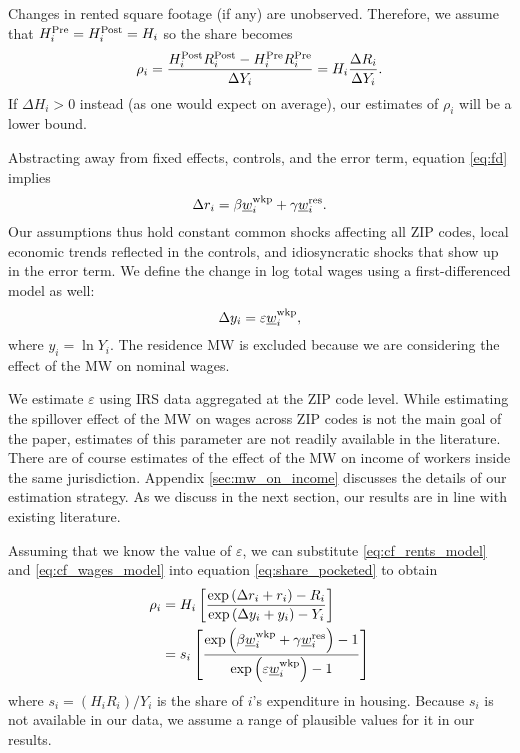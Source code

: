 Changes in rented square footage (if any) are unobserved.
Therefore, we assume that
$H^{\text{Pre}}_i = H^{\text{Post}}_i = H_i$ 
so the share becomes
\begin{equation}\label{eq:share_pocketed}
    \rho_i = \frac{H^{\text{Post}}_i R^{\text{Post}}_i - H^{\text{Pre}}_i R^{\text{Pre}}_i}{\Delta Y_i} = 
                H_i \frac{\Delta R_i}{\Delta Y_i} .
\end{equation}
If $\Delta H_i > 0$ instead (as one would expect on average), 
our estimates of $\rho_i$ will be a lower bound.

Abstracting away from fixed effects, controls, and the error term, 
equation \eqref{eq:fd} implies
\begin{equation}\label{eq:cf_rents_model}
    \Delta r_i = \beta \underline{w}_i^{\text{wkp}} + \gamma \underline{w}_i^{\text{res}} .
\end{equation}
Our assumptions thus hold 
constant common shocks affecting all ZIP codes,
local economic trends reflected in the controls, and
idiosyncratic shocks that show up in the error term.
We define the change in log total wages using a first-differenced model as well:
\begin{equation}\label{eq:cf_wages_model}
    \Delta y_i = \varepsilon \underline{w}_i^{\text{wkp}} ,
\end{equation}
where $y_i=\ln Y_i$.
The residence MW is excluded because we are considering the effect of the MW on 
nominal wages.

We estimate $\varepsilon$ using IRS data aggregated at the ZIP code level.
While estimating the spillover effect of the MW on wages across ZIP codes is 
not the main goal of the paper, 
estimates of this parameter are not readily available in the literature.
There are of course estimates of the effect of the MW on income of workers
inside the same jurisdiction.
Appendix \ref{sec:mw_on_income} discusses the details of our estimation 
strategy.
As we discuss in the next section, our results are in line with existing 
literature.

%
%
%

Assuming that we know the value of $\varepsilon$, we can substitute
\eqref{eq:cf_rents_model} and \eqref{eq:cf_wages_model} into equation
\eqref{eq:share_pocketed} to obtain
\begin{equation}\label{eq:rho}
    \begin{split}
        \rho_i & = H_i \left[ 
        \frac{\exp \left(\Delta r_i + r_i \right) - R_i }
             {\exp \left(\Delta y_i + y_i \right) - Y_i }
        \right] \\
        & = s_i \left[
            \frac{\exp \left( \beta \underline{w}_i^{\text{wkp}} + \gamma \underline{w}_i^{\text{res}} \right) - 1 }
                {\exp \left( \varepsilon \underline{w}_i^{\text{wkp}} \right) - 1 }
            \right]
    \end{split}
\end{equation}
where $s_i = \left(H_i R_i\right)/Y_i$ is the share of $i$'s expenditure in 
housing.
Because $s_i$ is not available in our data, we assume a range of plausible 
values for it in our results.

